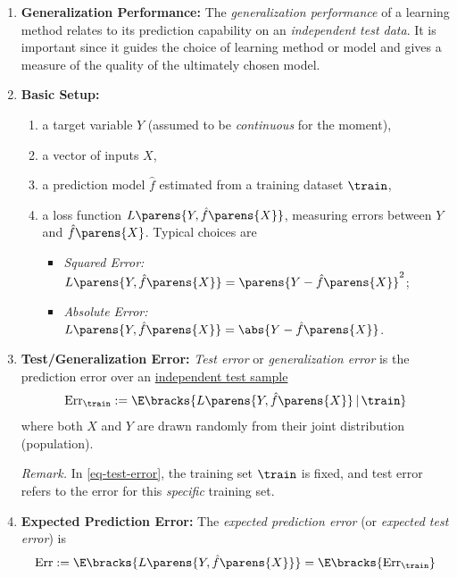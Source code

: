 \documentclass[12pt]{article}
\begin{document}
\begin{enumerate}[label=\textbf{\arabic*.}]

	\item \textbf{Generalization Performance:} The \textit{generalization performance} of a learning method relates to its prediction capability on an \emph{independent test data}. It is important since it guides the choice of learning method or model and gives a measure of the quality of the ultimately chosen model. 
	
	\item \textbf{Basic Setup:} 
	\begin{enumerate}
		\item a target variable $Y$ (assumed to be \emph{continuous} for the moment), 
		\item a vector of inputs $X$, 
		\item a prediction model $\hat{f}$ estimated from a training dataset $\train$, 
		\item a loss function $L \parens{Y, \hat{f} \parens{X}}$, measuring errors between $Y$ and $\hat{f} \parens{X}$. Typical choices are 
		\begin{itemize}
			\item \textit{Squared Error:} $L \parens{Y, \hat{f} \parens{X}} = \parens{Y - \hat{f} \parens{X}}^2$; 
			\item \textit{Absolute Error:} $L \parens{Y, \hat{f} \parens{X}} = \abs{Y - \hat{f} \parens{X}}$. 
		\end{itemize}
	\end{enumerate}
	
	\item \textbf{Test/Generalization Error:} \textit{Test error} or \textit{generalization error} is the prediction error over an \underline{independent test sample}
	\begin{align}\label{eq-test-error}
		\mathrm{Err}_{\train} := \E \bracks{ L \parens{Y, \hat{f} \parens{X}} \,\vert\, \train}
	\end{align}
	where both $X$ and $Y$ are drawn randomly from their joint distribution (population). 
	
	\textit{Remark.} In \eqref{eq-test-error}, the training set $\train$ is fixed, and test error refers to the error for this \textit{specific} training set. 
	
	\item \textbf{Expected Prediction Error:} The \emph{expected prediction error} (or \emph{expected test error}) is 
	\begin{align}\label{eq-epe}
		\mathrm{Err} := \E \bracks{ L \parens{Y, \hat{f} \parens{X} } } = \E \bracks{ \mathrm{Err}_{\train} }
	\end{align}
	

\end{enumerate}
\end{document}
